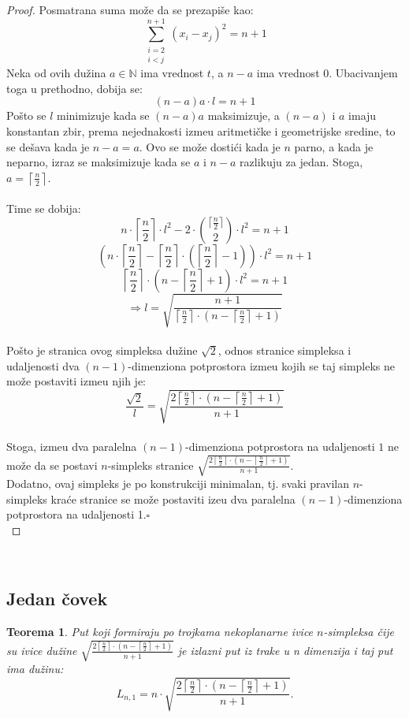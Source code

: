 \documentclass[11pt,letter]{article}
\newtheorem{teo}{\bf Teorema}[section]
\newcommand{\qed}{\hfill $\square$ \bigskip}
\begin{document}
\begin{proof}
\indent Posmatrana suma mo\v ze da se prezapi\v se kao:
$$\sum^{n+1}_{\substack{i=2\\ i<j}}(x_i-x_j)^2=n+1$$
\indent Neka od ovih du\v zina $a\in \mathbb{N}$ ima vrednost $t$, a $n-a$ ima vrednost 0. Ubacivanjem toga u prethodno, dobija se:
$$(n-a)a\cdot l=n+1$$
\indent Po\v sto se $l$ minimizuje kada se $(n-a)a$ maksimizuje, a $(n-a)$ i $a$ imaju konstantan zbir, prema nejednakosti izme\dj u aritmeti\v cke i geometrijske sredine, to se de\v sava kada je $n-a=a$. Ovo se mo\v ze dosti\' ci kada je $n$ parno, a kada je neparno, izraz se maksimizuje kada se $a$ i $n-a$ razlikuju za jedan. Stoga, $a= \left \lceil{\frac{n}{2}}\right \rceil$.
\\
\\
\indent Time se dobija:
$$n\cdot \left \lceil{\frac{n}{2}}\right \rceil\cdot l^2-2\cdot {{\lceil{\frac{n}{2}}\rceil}\choose {2}}\cdot l^2=n+1$$
$$\left( n\cdot \left \lceil \frac{n}{2} \right \rceil - {\left \lceil \frac{n}{2} \right\rceil} \cdot \left( \left \lceil \frac{n}{2}\right \rceil -1 \right) \right) \cdot l^2=n+1$$
$$\left \lceil \frac{n}{2} \right \rceil \cdot \left( n-\left \lceil \frac{n}{2}\right \rceil +1 \right)\cdot l^2=n+1$$
$$\Rightarrow l=\sqrt{\frac{n+1}{\left\lceil \frac{n}{2}\right\rceil \cdot \left( n-\left\lceil \frac{n}{2}\right\rceil+1\right)}}$$
\\
\indent Po\v sto je stranica ovog simpleksa du\v zine $\sqrt2$, odnos stranice simpleksa i udaljenosti dva $(n-1)$-dimenziona potprostora izme\dj u  kojih se taj simpleks ne mo\v ze postaviti izme\dj u njih je:
$$\frac{\sqrt2}{l}=\sqrt{\frac{2\left\lceil \frac{n}{2}\right\rceil\cdot \left( n-\left\lceil\frac{n}{2}\right\rceil+1\right)}{n+1}}$$
\\
\indent Stoga, izme\dj u dva paralelna $(n-1)$-dimenziona potprostora na udaljenosti $1$ ne mo\v ze da se postavi $n$-simpleks stranice  $\sqrt{\frac{2\left\lceil \frac{n}{2}\right\rceil\cdot \left( n-\left\lceil\frac{n}{2}\right\rceil+1\right)}{n+1}}$.
\\
\indent Dodatno, ovaj simpleks je po konstrukciji minimalan, tj. svaki pravilan $n$-simpleks kra\' ce stranice se mo\v ze postaviti ize\dj u dva paralelna $(n-1)$-dimenziona potprostora na udaljenosti 1.\qed
\\
\end{proof}
\\
\subsection[Jedan \v covek]{Jedan \v covek}
\bigskip
\begin{teo} Put koji formiraju po trojkama nekoplanarne ivice $n$-simpleksa \v cije su ivice du\v zine $\sqrt{\frac{2\left\lceil \frac{n}{2}\right\rceil\cdot \left( n-\left\lceil\frac{n}{2}\right\rceil+1\right)}{n+1}}$ je izlazni put iz trake u n dimenzija i taj put ima du\v zinu:
$$L_{n,1}=n\cdot \sqrt{\frac{2\left\lceil \frac{n}{2}\right\rceil\cdot \left( n-\left\lceil\frac{n}{2}\right\rceil+1\right)}{n+1}}.$$\end{teo}
\smallskip
\end{document}
